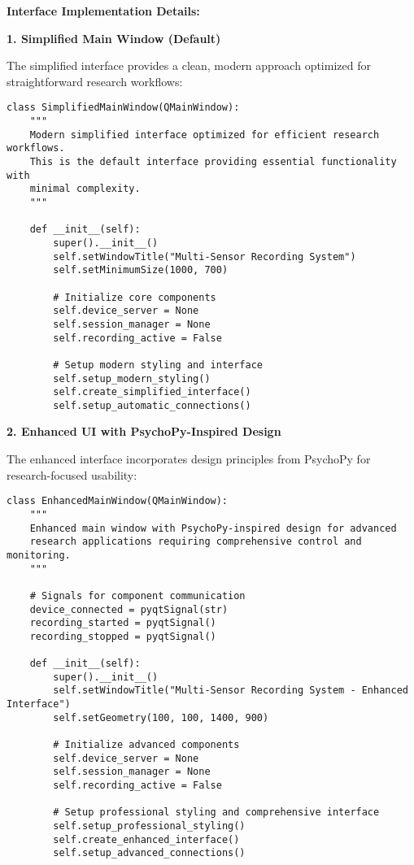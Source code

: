 \documentclass[12pt,a4paper]{article}
\begin{document}
\textbf{Interface Implementation Details:}

\textbf{1. Simplified Main Window (Default)}

The simplified interface provides a clean, modern approach optimized for straightforward research workflows:

\begin{verbatim}
class SimplifiedMainWindow(QMainWindow):
    """
    Modern simplified interface optimized for efficient research workflows.
    This is the default interface providing essential functionality with
    minimal complexity.
    """
    
    def __init__(self):
        super().__init__()
        self.setWindowTitle("Multi-Sensor Recording System")
        self.setMinimumSize(1000, 700)
        
        # Initialize core components
        self.device_server = None
        self.session_manager = None
        self.recording_active = False
        
        # Setup modern styling and interface
        self.setup_modern_styling()
        self.create_simplified_interface()
        self.setup_automatic_connections()
\end{verbatim}

\textbf{2. Enhanced UI with PsychoPy-Inspired Design}

The enhanced interface incorporates design principles from PsychoPy for research-focused usability:

\begin{verbatim}
class EnhancedMainWindow(QMainWindow):
    """
    Enhanced main window with PsychoPy-inspired design for advanced
    research applications requiring comprehensive control and monitoring.
    """
    
    # Signals for component communication
    device_connected = pyqtSignal(str)
    recording_started = pyqtSignal()
    recording_stopped = pyqtSignal()
    
    def __init__(self):
        super().__init__()
        self.setWindowTitle("Multi-Sensor Recording System - Enhanced Interface")
        self.setGeometry(100, 100, 1400, 900)
        
        # Initialize advanced components
        self.device_server = None
        self.session_manager = None
        self.recording_active = False
        
        # Setup professional styling and comprehensive interface
        self.setup_professional_styling()
        self.create_enhanced_interface()
        self.setup_advanced_connections()
\end{verbatim}
\end{document}
